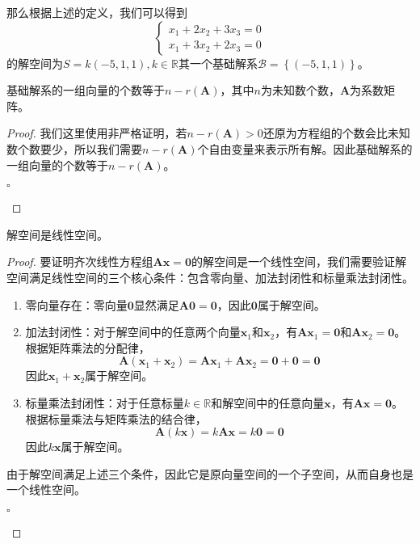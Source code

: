 那么根据上述的定义，我们可以得到$$\left\{\begin{matrix} 
	x_1+2x_2+3x_3=0 \\  
	x_1+3x_2+2x_3=0
\end{matrix}\right. $$的解空间为$S=k(-5,1,1),k\in \mathbb{R}$其一个基础解系$\mathcal{B}=\left\{ (-5,1,1) \right\}$。

\begin{corollary}
	基础解系的一组向量的个数等于$n-r(\mathbf{A})$，其中$n$为未知数个数，$\mathbf{A}$为系数矩阵。
\end{corollary}

\begin{proof}
	我们这里使用非严格证明，若$n-r(\mathbf{A})>0$还原为方程组的个数会比未知数个数要少，所以我们需要$n-r(\mathbf{A})$个自由变量来表示所有解。因此基础解系的一组向量的个数等于$n-r(\mathbf{A})$。\begin{flushright}
		$\square$
	\end{flushright}
\end{proof}

\begin{corollary}
	解空间是线性空间。
\end{corollary}

\begin{proof}
	要证明齐次线性方程组$\mathbf{A}\boldsymbol{x} = \boldsymbol{0}$的解空间是一个线性空间，我们需要验证解空间满足线性空间的三个核心条件：包含零向量、加法封闭性和标量乘法封闭性。
	\begin{enumerate}
		\item 零向量存在：零向量$\boldsymbol{0}$显然满足$\mathbf{A}\boldsymbol{0} = \boldsymbol{0}$，因此$\boldsymbol{0}$属于解空间。
		\item 加法封闭性：对于解空间中的任意两个向量$\boldsymbol{x}_1$和$\boldsymbol{x}_2$，有$\mathbf{A}\boldsymbol{x}_1 = \boldsymbol{0}$和$\mathbf{A}\boldsymbol{x}_2 = \boldsymbol{0}$。根据矩阵乘法的分配律，  
		$$
		\mathbf{A}(\boldsymbol{x}_1 + \boldsymbol{x}_2) = \mathbf{A}\boldsymbol{x}_1 + \mathbf{A}\boldsymbol{x}_2 = \boldsymbol{0} + \boldsymbol{0} = \boldsymbol{0}
		$$
		因此$\boldsymbol{x}_1 + \boldsymbol{x}_2$属于解空间。
		\item 标量乘法封闭性：对于任意标量$k \in \mathbb{R}$和解空间中的任意向量$\boldsymbol{x}$，有$\mathbf{A}\boldsymbol{x} = \boldsymbol{0}$。根据标量乘法与矩阵乘法的结合律，  
		$$
		\mathbf{A}(k\boldsymbol{x}) = k\mathbf{A}\boldsymbol{x} = k\boldsymbol{0} = \boldsymbol{0}
		$$
		因此$k\boldsymbol{x}$属于解空间。
	\end{enumerate}
	由于解空间满足上述三个条件，因此它是原向量空间的一个子空间，从而自身也是一个线性空间。\begin{flushright}
		$\square$
	\end{flushright}
\end{proof}

